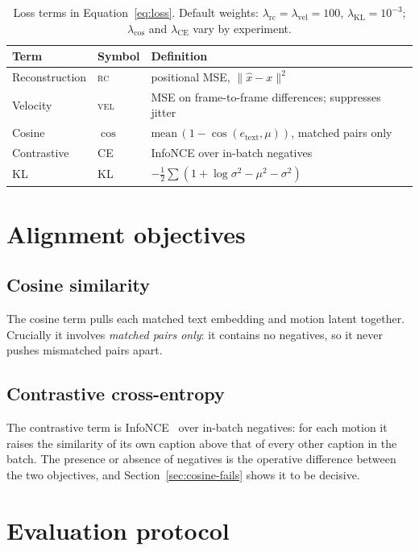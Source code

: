 \documentclass[11pt,a4paper]{report}
\newcommand{\rc}{\textsc{rc}}
\newcommand{\vel}{\textsc{vel}}
\newcommand{\lkl}{\ensuremath{\lambda_{\mathrm{KL}}}}
\newcommand{\lrc}{\ensuremath{\lambda_{\mathrm{rc}}}}
\newcommand{\lvel}{\ensuremath{\lambda_{\mathrm{vel}}}}
\begin{document}
\begin{table}[H]
\centering
\caption{Loss terms in Equation~\ref{eq:loss}. Default weights:
$\lrc=\lvel=100$, $\lkl=10^{-3}$; $\lambda_{\cos}$ and
$\lambda_{\mathrm{CE}}$ vary by experiment.}
\label{tab:loss}
\small
\begin{tabular}{@{}llp{8.4cm}@{}}
\toprule
Term & Symbol & Definition \\
\midrule
Reconstruction & \rc  & positional MSE, $\lVert \hat x - x\rVert^2$ \\
Velocity       & \vel & MSE on frame-to-frame differences; suppresses jitter \\
Cosine         & $\cos$ & $\mathrm{mean}\,(1-\cos(e_{\text{text}},\mu))$, matched pairs only \\
Contrastive    & CE   & InfoNCE over in-batch negatives \\
KL             & KL   & $-\tfrac12\sum(1+\log\sigma^2-\mu^2-\sigma^2)$ \\
\bottomrule
\end{tabular}
\end{table}

\section{Alignment objectives}

\subsection{Cosine similarity}
The cosine term pulls each matched text embedding and motion latent
together. Crucially it involves \emph{matched pairs only}: it contains no
negatives, so it never pushes mismatched pairs apart.

\subsection{Contrastive cross-entropy}
The contrastive term is InfoNCE~\cite{oord2018infonce} over in-batch
negatives: for each motion it raises the similarity of its own caption
above that of every other caption in the batch. The presence or absence of
negatives is the operative difference between the two objectives, and
Section~\ref{sec:cosine-fails} shows it to be decisive.

\section{Evaluation protocol}
\label{sec:eval}
\end{document}
